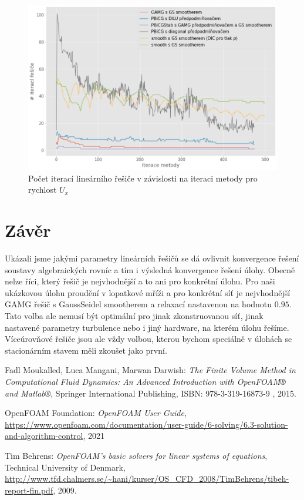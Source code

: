 \documentclass[a4paper,12pt]{report}
\theoremstyle{remark}
\begin{document}
\begin{figure}[H]
	\centering
	\includegraphics[width=1\linewidth]{ux-solver-iters.png}
	\caption{Počet iterací lineárního řešiče v závislosti na iteraci metody pro rychlost $U_x$}
	\label{fig:ux-iters}
\end{figure}

{\let\clearpage\relax \chapter{Závěr}}

Ukázali jsme jakými parametry lineárních řešičů se dá ovlivnit konvergence řešení soustavy algebraických rovníc a tím i výsledná konvergence řešení úlohy. Obecně nelze říci, který řešič je nejvhodnější a to ani pro konkrétní úlohu. Pro naši ukázkovou úlohu proudění v lopatkové mříži a pro konkrétní síť je nejvhodnější GAMG řešič s GaussSeidel smootherem a relaxací nastavenou na hodnotu $0.95$. Tato volba ale nemusí být optimální pro jinak zkonstruovanou síť, jinak nastavené parametry turbulence nebo i jiný hardware, na kterém úlohu řešíme. Víceúrovňové řešiče jsou ale vždy volbou, kterou bychom speciálně v úlohách se stacionárním stavem měli zkoušet jako první.

\begin{thebibliography}{Literatura}
	 Fadl Moukalled, Luca Mangani, Marwan Darwish:
	\emph{The Finite Volume Method in Computational Fluid Dynamics: An Advanced Introduction with OpenFOAM® and Matlab®}, Springer International Publishing, ISBN: 978-3-319-16873-9 , 2015.
	
	OpenFOAM Foundation:
	\emph{OpenFOAM User Guide}, \url{https://www.openfoam.com/documentation/user-guide/6-solving/6.3-solution-and-algorithm-control}, 2021
	
	 Tim Behrens:
	\emph{OpenFOAM's basic solvers for linear systems of equations}, Technical University of Denmark, \url{http://www.tfd.chalmers.se/~hani/kurser/OS_CFD_2008/TimBehrens/tibeh-report-fin.pdf}, 2009.
	

\end{thebibliography}
\end{document}
